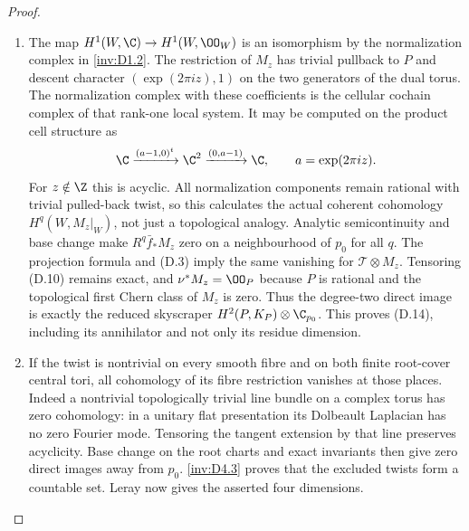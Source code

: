 \begin{proof}
\begin{enumerate}[label=\arabic*.,leftmargin=*]
\item The map $H^1(W,\C)\to H^1(W,\OO_W)$ is an isomorphism by the
normalization complex in \ref{inv:D1.2}. The restriction of $M_z$ has trivial
pullback to $P$ and descent character
$(\exp(2\pi iz),1)$ on the two generators of the dual torus. The
normalization complex with these coefficients is the cellular
cochain complex of that rank-one local system. It may be computed
on the product cell structure as
\[
 \C\xrightarrow{(a-1,0)^t}\C^2
 \xrightarrow{(0,a-1)}\C,
 \qquad a=\exp(2\pi iz).
\]
For $z\notin\Z$ this is acyclic. All normalization components remain
rational with trivial pulled-back twist, so this calculates the
actual coherent cohomology $H^q(W,M_z|_W)$, not just a topological
analogy. Analytic semicontinuity and base change make
$R^q\bar f_*M_z$ zero on a neighbourhood of $p_0$ for all $q$.
The projection formula and (D.3) imply the same vanishing for
$\mathcal T\otimes M_z$. Tensoring (D.10) remains exact, and
$\nu^*M_z=\OO_P$ because $P$ is rational and the topological first
Chern class of $M_z$ is zero. Thus the degree-two direct image is
exactly the reduced skyscraper $H^2(P,K_P)\otimes\C_{p_0}$.
This proves (D.14), including its annihilator and not only its residue
dimension.

\item If the twist is nontrivial on every smooth fibre and on both finite
root-cover central tori, all cohomology of its fibre restriction
vanishes at those places. Indeed a nontrivial topologically trivial
line bundle on a complex torus has zero cohomology: in a unitary flat
presentation its Dolbeault Laplacian has no zero Fourier mode.
Tensoring the tangent extension by that line preserves acyclicity.
Base change on the root charts and exact invariants then give zero
direct images away from $p_0$. \ref{inv:D4.3} proves that the excluded twists
form a countable set. Leray now gives the asserted four dimensions.
\end{enumerate}
\end{proof}

